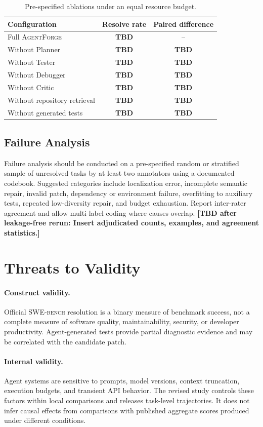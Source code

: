 \documentclass[journal]{IEEEtran}
\newcommand{\agentforge}{\textsc{AgentForge}}
\newcommand{\swebench}{\textsc{SWE-bench}}
\newcommand{\tbd}[1]{\textcolor{red!70!black}{\textbf{[TBD after leakage-free rerun: #1]}}}
\newcommand{\res}{\textcolor{red!70!black}{\textbf{TBD}}}
\begin{document}
\begin{table}[t]
\centering
\caption{Pre-specified ablations under an equal resource budget.}
\label{tab:ablation}
\begin{tabular}{lcc}
\toprule
Configuration & Resolve rate & Paired difference \\
\midrule
Full \agentforge{} & \res & -- \\
Without Planner & \res & \res \\
Without Tester & \res & \res \\
Without Debugger & \res & \res \\
Without Critic & \res & \res \\
Without repository retrieval & \res & \res \\
Without generated tests & \res & \res \\
\bottomrule
\end{tabular}
\end{table}

\subsection{Failure Analysis}

Failure analysis should be conducted on a pre-specified random or stratified sample of unresolved tasks by at least two annotators using a documented codebook. Suggested categories include localization error, incomplete semantic repair, invalid patch, dependency or environment failure, overfitting to auxiliary tests, repeated low-diversity repair, and budget exhaustion. Report inter-rater agreement and allow multi-label coding where causes overlap. \tbd{Insert adjudicated counts, examples, and agreement statistics.}

\section{Threats to Validity}
\label{sec:threats}

\paragraph{Construct validity.}
Official \swebench{} resolution is a binary measure of benchmark success, not a complete measure of software quality, maintainability, security, or developer productivity. Agent-generated tests provide partial diagnostic evidence and may be correlated with the candidate patch.

\paragraph{Internal validity.}
Agent systems are sensitive to prompts, model versions, context truncation, execution budgets, and transient API behavior. The revised study controls these factors within local comparisons and releases task-level trajectories. It does not infer causal effects from comparisons with published aggregate scores produced under different conditions.
\end{document}
